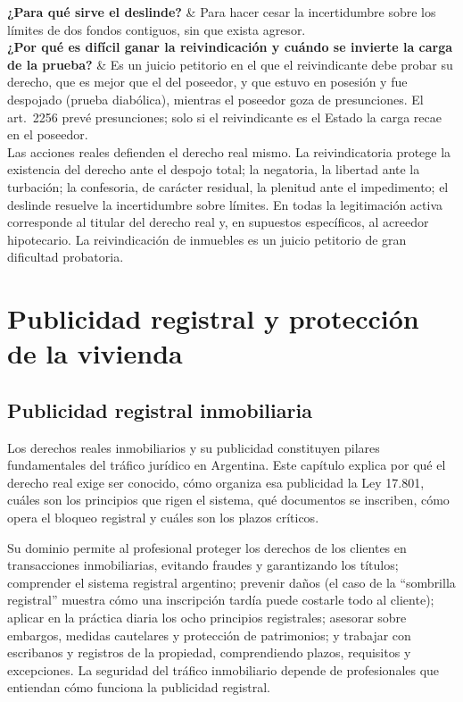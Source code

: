 \documentclass[12pt,oneside]{book}
\newcommand{\cq}[2]{\textbf{#1} & #2 \\[0.45em]}
\begin{document}
{\cq{¿Para qué sirve el deslinde?}{Para hacer cesar la incertidumbre sobre los límites de dos fondos contiguos, sin que exista agresor.}
\cq{¿Por qué es difícil ganar la reivindicación y cuándo se invierte la carga de la prueba?}{Es un juicio petitorio en el que el reivindicante debe probar su derecho, que es mejor que el del poseedor, y que estuvo en posesión y fue despojado (prueba diabólica), mientras el poseedor goza de presunciones. El art.~2256 prevé presunciones; solo si el reivindicante es el Estado la carga recae en el poseedor.}
}{Las acciones reales defienden el derecho real mismo. La reivindicatoria protege la existencia del derecho ante el despojo total; la negatoria, la libertad ante la turbación; la confesoria, de carácter residual, la plenitud ante el impedimento; el deslinde resuelve la incertidumbre sobre límites. En todas la legitimación activa corresponde al titular del derecho real y, en supuestos específicos, al acreedor hipotecario. La reivindicación de inmuebles es un juicio petitorio de gran dificultad probatoria.}



\part{Publicidad registral y protección de la vivienda}

\chapter{Publicidad registral inmobiliaria}\label{cap:registral}

Los derechos reales inmobiliarios y su publicidad constituyen pilares fundamentales del tráfico jurídico en Argentina. Este capítulo explica por qué el derecho real exige ser conocido, cómo organiza esa publicidad la Ley 17.801, cuáles son los principios que rigen el sistema, qué documentos se inscriben, cómo opera el bloqueo registral y cuáles son los plazos críticos.

Su dominio permite al profesional proteger los derechos de los clientes en transacciones inmobiliarias, evitando fraudes y garantizando los títulos; comprender el sistema registral argentino; prevenir daños (el caso de la ``sombrilla registral'' muestra cómo una inscripción tardía puede costarle todo al cliente); aplicar en la práctica diaria los ocho principios registrales; asesorar sobre embargos, medidas cautelares y protección de patrimonios; y trabajar con escribanos y registros de la propiedad, comprendiendo plazos, requisitos y excepciones. La seguridad del tráfico inmobiliario depende de profesionales que entiendan cómo funciona la publicidad registral.
\end{document}

